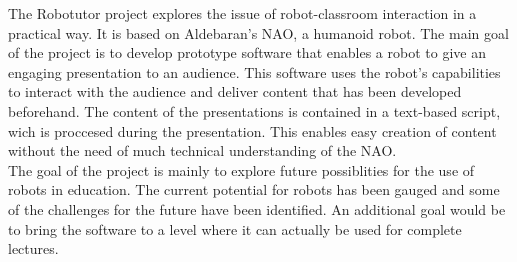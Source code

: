 The Robotutor project explores the issue of robot-classroom interaction in a practical way. It is based on Aldebaran's NAO, a humanoid robot. The main goal of the project is to develop prototype software that enables a robot to give an engaging presentation to an audience. This software uses the robot's capabilities to interact with the audience and deliver content that has been developed beforehand. The content of the presentations is contained in a text-based script, wich is proccesed during the presentation. This enables easy creation of content without the need of much technical understanding of the NAO.\\
The goal of the project is mainly to explore future possiblities for the use of robots in education. The current potential for robots has been gauged and some of the challenges for the future have been identified. An additional goal would be to bring the software to a level where it can actually be used for complete lectures.\\
